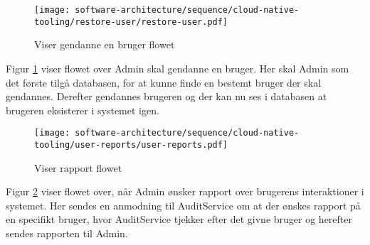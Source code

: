 \begin{figure}[H]
    \centering
\texttt{[image: software-architecture/sequence/cloud-native-tooling/restore-user/restore-user.pdf]}
\caption{Viser gendanne en bruger flowet}
\label{fig:restore}
\end{figure}
Figur \ref{fig:restore} viser flowet over Admin skal gendanne en bruger. Her skal Admin som det første tilgå databasen, for at kunne finde en bestemt bruger der skal gendannes. Derefter gendannes brugeren og der kan nu ses i databasen at brugeren eksisterer i systemet igen.  

\begin{figure}[H]
    \centering
\texttt{[image: software-architecture/sequence/cloud-native-tooling/user-reports/user-reports.pdf]}
\caption{Viser rapport flowet}
\label{fig:rapport}
\end{figure}
Figur \ref{fig:rapport} viser flowet over, når Admin ønsker rapport over brugerens interaktioner i systemet. Her sendes en anmodning til AuditService om at der ønskes rapport på en specifikt bruger, hvor AuditService tjekker efter det givne bruger og herefter sendes rapporten til Admin.